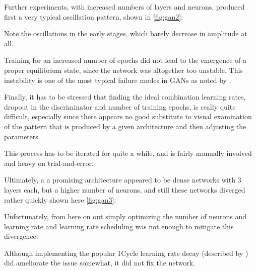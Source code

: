
\pagebreak 

Further experiments, with increased numbers of layers and neurons, produced first a very typical oscillation pattern, shown in \ref{fig:gan2}:
 

Note the oscillations in the early stages, which barely decrease in amplitude at all. 

Training for an increased number of epochs did not lead to the emergence of a proper equilibrium state, since the network was altogether too unstable. This instability is one of the most typical failure modes in \acp{GAN} as noted by \cite{wiatrak2020stabilizing}.

\pagebreak 

Finally, it has to be stressed that finding the ideal combination learning rates, dropout in the discriminator and number of training epochs, is really quite difficult, especially since there appears no good substitute to visual examination of the pattern that is produced by a given architecture and then adjusting the parameters. 

This process has to be iterated for quite a while, and is fairly manually involved and heavy on trial-and-error.
 
Ultimately, a a promising architecture appeared to be dense networks with 3 layers each, but a higher number of neurons, and still these networks diverged rather quickly shown here \ref{fig:gan3}:
 

Unfortunately, from here on out simply optimizing the number of neurons and learning rate and learning rate scheduling was not enough to mitigate this divergence. 

Although implementing the popular 1Cycle learning rate decay (described by \cite{smith_1cycle}) did ameliorate the issue somewhat, it did not fix the network.


